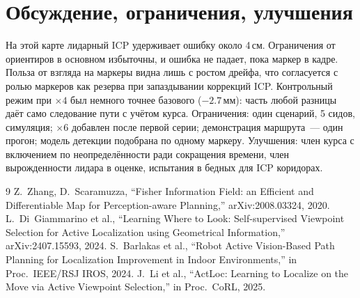 \documentclass[10pt,twocolumn]{article}
\begin{document}
\section{Обсуждение, ограничения, улучшения}
На этой карте лидарный ICP удерживает ошибку около 4\,см. Ограничения от ориентиров в основном избыточны, и ошибка не падает, пока маркер в кадре. Польза от взгляда на маркеры видна лишь с ростом дрейфа, что согласуется с ролью маркеров как резерва при запаздывании коррекций ICP.
Контрольный режим при ${\times}4$ был немного точнее базового ($-2.7$\,мм): часть любой разницы даёт само следование пути с учётом курса.
Ограничения: один сценарий, 5 сидов, симуляция; ${\times}6$ добавлен после первой серии; демонстрация маршрута~--- один прогон; модель детекции подобрана по одному маркеру. Улучшения: член курса с включением по неопределённости ради сокращения времени, член вырожденности лидара в оценке, испытания в бедных для ICP коридорах.

\footnotesize
\begin{thebibliography}{9}\setlength{\itemsep}{0pt}
 \foreignlanguage{english}{Z.~Zhang, D.~Scaramuzza, ``Fisher Information Field: an Efficient and Differentiable Map for Perception-aware Planning,'' arXiv:2008.03324, 2020.}
 \foreignlanguage{english}{L.~Di~Giammarino et al., ``Learning Where to Look: Self-supervised Viewpoint Selection for Active Localization using Geometrical Information,'' arXiv:2407.15593, 2024.}
 \foreignlanguage{english}{S.~Barlakas et al., ``Robot Active Vision-Based Path Planning for Localization Improvement in Indoor Environments,'' in Proc.\ IEEE/RSJ IROS, 2024.}
 \foreignlanguage{english}{J.~Li et al., ``ActLoc: Learning to Localize on the Move via Active Viewpoint Selection,'' in Proc.\ CoRL, 2025.}
\end{thebibliography}

\clearpage
\onecolumn
\setcounter{figure}{0}
\renewcommand{\thefigure}{П\arabic{figure}}
\captionsetup{font=small,skip=4pt}
\setlength{\textfloatsep}{12pt plus 2pt}\setlength{\floatsep}{12pt plus 2pt}
\makeatletter\setlength{\@fptop}{0pt}\makeatother%
\label{app:start}
\end{document}
